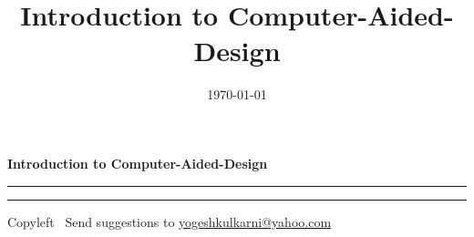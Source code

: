 
\graphicspath{{images/}}
\usepackage{beamerarticle}
\usepackage{listings}
%
%


\title[Intro to CAD \hspace{4cm} \insertframenumber /\inserttotalframenumber]{Introduction to Computer-Aided-Design}  
\subtitle[]{}
\date[2014]{\today} 






\raggedright
\footnotesize
\begin{center}
     \Large{\textbf{Introduction to Computer-Aided-Design}}  
\end{center}
\rule{\linewidth}{0.25pt}

\begin{multicols}{3}




\rule{\linewidth}{0.25pt}
\scriptsize
Copyleft \textcopyleft\  Send suggestions to 
\href{http://www.yogeshkulkarni.com}{yogeshkulkarni@yahoo.com}


\end{multicols}





